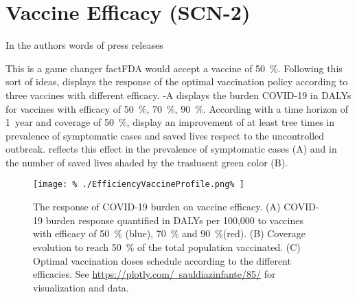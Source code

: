 \section*{Vaccine Efficacy (SCN-2)}
    In the authors words of press releases
    \begin{quotation}

    \end{quotation}
    This is a game changer fact\textemdash FDA would accept a vaccine of
    \SI{50}{\percent}. Following this sort of ideas,
    displays the response of the optimal vaccination policy according to three
    vaccines with different efficacy. -A
    displays the burden COVID-19 in DALYs for vaccines with
    efficacy of \SI{50}{\percent}, \SI{70}{\percent}, \SI{90}{\percent}.
    According with a time horizon of \SI{1}{year} and coverage of
    \SI{50}{\percent},  display an
    improvement of at least tree times in prevalence of symptomatic cases and
    saved lives respect to the uncontrolled outbreak.
     reflects this
    effect in the prevalence of symptomatic cases (A) and in the number
    of saved lives shaded by the traslusent green color (B).
%
%
    \begin{figure*}[htb]
        \centering
        \texttt{[image: \%
            ./EfficiencyVaccineProfile.png\%
        ]}
        \caption[The response of COVID-19 on vaccine efficacy]{
            The response of COVID-19 burden on vaccine efficacy.
            (A) COVID-19 burden response quantified in DALYs per 100,000 to
            vaccines with efficacy of \SI{50}{\percent} (blue),
            \SI{70}{\percent} and \SI{90}{\percent}(red).
            (B) Coverage evolution to reach \SI{50}{\percent} of the total
            population vaccinated.
            (C) Optimal vaccination doses schedule according to the
            different efficacies. See
            \href{https://plotly.com/~sauldiazinfante/85/}{%
                https://plotly.com/~sauldiazinfante/85/} for
            visualization and data.
        }
        \label{fig:efficiencyvaccineprofile}
    \end{figure*}
